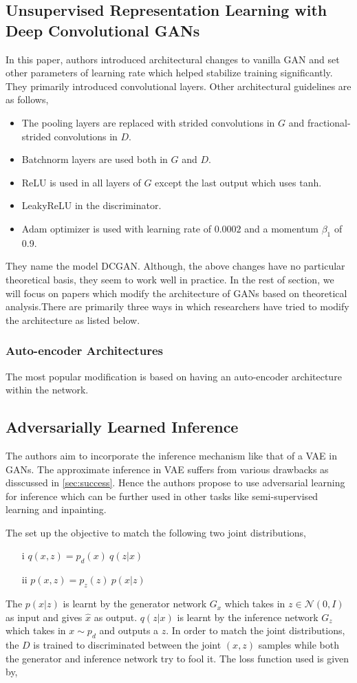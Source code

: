 \subsection*{Unsupervised Representation Learning with Deep Convolutional GANs \citep{dcgan}} In this paper, authors introduced architectural changes to vanilla GAN and set other parameters of learning rate which helped stabilize training significantly. They primarily introduced convolutional layers. Other architectural guidelines are as follows,
\begin{itemize}
    \item The pooling layers are replaced with strided convolutions in $G$ and fractional-strided convolutions in $D$.
    \item Batchnorm layers are used both in $G$ and $D$.
    \item  ReLU is used in all layers of $G$ except the last output which uses tanh.
    \item LeakyReLU in the discriminator.
    \item Adam optimizer is used \citep{adam} with learning rate of $0.0002$ and a momentum $\beta_1$ of 0.9.
\end{itemize}{}
They name the model DCGAN.
Although, the above changes have no particular theoretical basis, they seem to work well in practice. In the rest of section, we will focus on papers which modify the architecture of GANs based on theoretical analysis.There are primarily three ways in which researchers have tried to modify the architecture as listed below. 
\subsubsection{Auto-encoder Architectures} \label{subsubsec:arch_ae} The most popular modification is based on having an auto-encoder architecture within the network.


\subsection*{Adversarially Learned Inference \citep{ali}}
The authors aim to incorporate the inference mechanism like that of a VAE in GANs. The approximate inference in VAE suffers from various drawbacks as disscussed in \ref{sec:success}. Hence the authors propose to use adversarial learning for inference which can be further used in other tasks like semi-supervised learning and inpainting. 

The set up the objective to match the following two joint distributions,
\begin{itemize}
    \item[i] $q(x, z) = p_d(x)\  q(z|x)$
    \item[ii] $p(x, z) = p_z(z)\  p(x|z)$
\end{itemize}{}
The $p(x|z)$ is learnt by the generator network $G_x$ which takes in $z \in \mathcal{N} (0, I)$ as input and gives $\hat{x}$ as output. $q(z|x)$ is learnt by the inference network $G_z$ which takes in $x\sim p_d$ and outputs a $\hat{z}$. In order to match the joint distributions, the $D$ is trained to discriminated between the joint $(x,z)$ samples while both the generator and inference network try to fool it.
The loss function used is given by,

